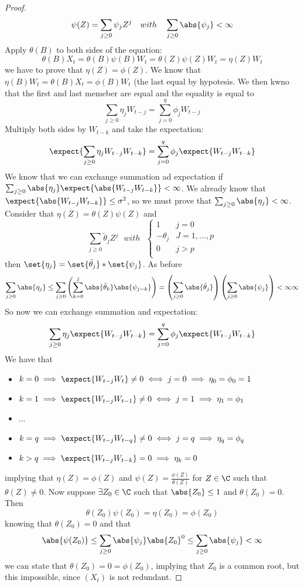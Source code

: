 \begin{proof}
    \[
        \psi(Z)=\sum_{j\ge0}\psi_jZ^j\ \ \ with\ \ \ \sum_{j\ge0}\abs{\psi_j}<\infty
    \]
    Apply $\theta(B)$ to both sides of the equation:
    \[
        \theta(B)X_t=\theta(B)\psi(B)W_t=\theta(Z)\psi(Z)W_t=\eta(Z)W_t
    \]
    we have to prove that $\eta(Z)=\phi(Z)$. We know that $\eta(B)W_t=\theta(B)X_t=\phi(B)W_t$ (the last equal by hypotesis. We then kwno that the first and last memeber are equal and the equality is equal to
    \[
        \sum_{j\ge0}\eta_jW_{t-j}=\sum_{j=0}^q\phi_jW_{t-j}  
    \]
    Multiply both sides by $W_{t-k}$ and take the expectation:
    \[
        \expect{\sum_{j\ge0}\eta_jW_{t-j}W_{t-k}}=\sum_{j=0}^q\phi_j\expect{W_{t-j}W_{t-k}} 
    \]
    We know that we can exchange summation ad expectation if $\sum_{j\ge0}\abs{\eta_j}\expect{\abs{W_{t-j}W_{t-k}}}<\infty$. We already know that $\expect{\abs{W_{t-j}W_{t-k}}}\le\sigma^2$, so we must prove that $\sum_{j\ge0}\abs{\eta_j}<\infty$. Consider that $\eta(Z)=\theta(Z)\psi(Z)$ and
    \[
        \sum_{j\ge0}\tilde{\theta}_jZ^j\ \ \ with\ \ \ 
        \begin{cases}
            1&j=0\\
            -\theta_j&J=1,...,p\\
            0&j>p\\
        \end{cases}
    \]
    then $\set{\eta_j}=\set{\tilde{\theta}_j}*\set{\psi_j}$. As before
    \[
        \sum_{j\ge0}\abs{\eta_j}\le\sum_{j\ge0}\left(\sum_{k=0}^j\abs{\tilde{\theta}_k}\abs{\psi_{j-k}}\right)=\left(\sum_{j\ge0}\abs{\tilde{\theta}_j}\right)\left(\sum_{j\ge0}\abs{\psi_j}\right)<\infty\infty
    \]
    So now we can exchange summation and expectation:
    \[
        \sum_{j\ge0}\eta_j\expect{W_{t-j}W_{t-k}}=\sum_{j=0}^q\phi_j\expect{W_{t-j}W_{t-k}}
    \]
    We have that
    \begin{itemize}
        \item $k=0\implies\expect{W_{t-j}W_t}\ne0\iff j=0\implies\eta_0=\phi_0=1$
        \item $k=1\implies\expect{W_{t-j}W_{t-1}}\ne0\iff j=1\implies\eta_1=\phi_1$
        \item ...
        \item $k=q\implies\expect{W_{t-j}W_{t-q}}\ne0\iff j=q\implies\eta_q=\phi_q$
        \item $k>q\implies\expect{W_{t-j}W_{t-k}}=0\implies\eta_k=0$
    \end{itemize}
    implying that $\eta(Z)=\phi(Z)$ and $\psi(Z)=\frac{\phi(Z)}{\theta(Z)}$ for $Z\in\C$ such that $\theta(Z)\ne0$. Now suppose $\exists Z_0\in\C$ such that $\abs{Z_0}\le1$ and $\theta(Z_0)=0$. Then
    \[
        \theta(Z_0)\psi(Z_0)=\eta(Z_0)=\phi(Z_0)  
    \]
    knowing that $\theta(Z_0)=0$ and that
    \[
        \abs{\psi(Z_0)}\le\sum_{j\ge0}\abs{\psi_j}\abs{Z_0}^0\le\sum_{j\ge0}\abs{\psi_j}<\infty
    \]
    we can state that $\theta(Z_0)=0=\phi(Z_0)$, implying that $Z_0$ is a common root, but this impossible, since $(X_t)$ is not redundant.
\end{proof}

